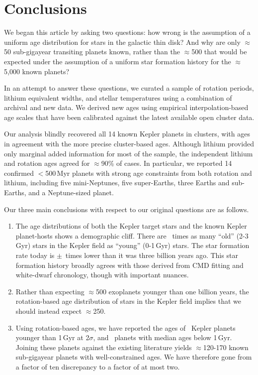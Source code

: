 \documentclass[11pt,twocolumn,tighten]{aastex63}
\begin{document}
\section{Conclusions}
\label{sec:conclusions}

We began this article by asking two questions: how wrong is the
assumption of a uniform age distribution for stars in the galactic
thin disk?  And why are only $\approx$50 sub-gigayear transiting
planets known, rather than the $\approx$500 that would be expected
under the assumption of a uniform star formation history for the
$\approx$5{,}000 known planets?

In an attempt to answer these questions, we curated a sample of
rotation periods, lithium equivalent widths, and stellar temperatures
using a combination of archival and new data.  We derived new ages
using empirical interpolation-based age scales that have been
calibrated against the latest available open cluster data.

Our analysis blindly recovered all 14 known Kepler planets in
clusters, with ages in agreement with the more precise cluster-based
ages.  Although lithium provided only marginal added information for
most of the sample, the independent lithium and rotation ages agreed
for $\approx$90\% of cases.  In particular, we reported 14 confirmed
$<$500\,Myr planets with strong age constraints from both rotation and
lithium, including five mini-Neptunes, five super-Earths, three Earths
and sub-Earths, and a Neptune-sized planet.

Our three main conclusions with respect to our original questions are
as follows.

\begin{enumerate}[leftmargin=*,topsep=0pt,itemsep=-1ex,partopsep=1ex,parsep=1ex]
  \item The age distributions of both the Kepler target stars and the
    known Kepler planet-hosts shows a demographic cliff.  There are
    \ratioobtoybstars\ times as many ``old'' (2-3\,Gyr) stars in the
    Kepler field as ``young'' (0-1\,Gyr) stars.  The star formation
    rate today is \ratiosfr$\pm$\uncratiosfr\ times lower than it was
    three billion years ago.
    This star formation history broadly agrees with those derived
    from CMD fitting and white-dwarf chronology, though with
    important nuances.
  \item Rather than expecting $\approx$500 exoplanets younger than one
    billion years, the rotation-based age distribution of stars in the
    Kepler field implies that we should instead expect $\approx$250.
  \item Using rotation-based ages, we have reported the ages of
    \nplyounggyrotwosigma\ Kepler planets younger than 1\,Gyr at 2$\sigma$,
    and \nplyounggyro\ planets with median ages below 1\,Gyr.
    Joining these planets against the existing literature yields
    $\approx$120-170 known sub-gigayear planets with well-constrained
    ages.  We have therefore gone from a factor of ten discrepancy to
    a factor of at most two.
\end{enumerate}
\end{document}
